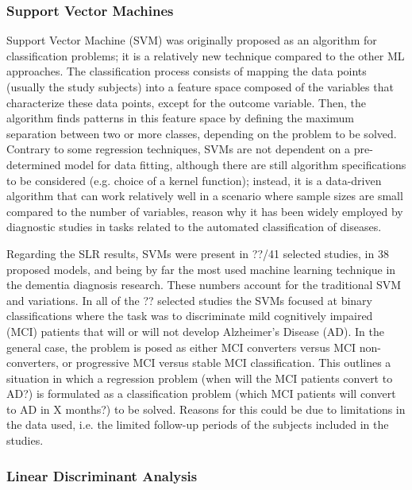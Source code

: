 \documentclass[10pt, letterpaper, twoside, openany]{thesis}
\begin{document}
\subsubsection{Support Vector Machines}
Support Vector Machine (SVM) was originally proposed as an algorithm for classification problems; it is a relatively new technique compared to the other ML approaches. The classification process consists of mapping the data points (usually the study subjects) into a feature space composed of the variables that characterize these data points, except for the outcome variable. Then, the algorithm finds patterns in this feature space by defining the maximum separation between two or more classes, depending on the problem to be solved. Contrary to some regression techniques, SVMs are not dependent on a pre-determined model for data fitting, although there are still algorithm specifications to be considered (e.g. choice of a kernel function); instead, it is a data-driven algorithm that can work relatively well in a scenario where sample sizes are small compared to the number of variables, reason why it has been widely employed by diagnostic studies in tasks related to the automated classification of diseases. 
\par 
Regarding the SLR results, SVMs were present in ??/41 selected studies, in 38 proposed models, and being by far the most used machine learning technique in the dementia diagnosis research. These numbers account for the traditional SVM and variations. In all of the ?? selected studies the SVMs focused at binary classifications where the task was to discriminate mild cognitively impaired (MCI) patients that will or will not develop Alzheimer's Disease (AD). In the general case, the problem is posed as either MCI converters versus MCI non-converters, or progressive MCI versus stable MCI classification. This outlines a situation in which a regression problem (when will the MCI patients convert to AD?) is formulated as a classification problem (which MCI patients will convert to AD in X months?) to be solved. Reasons for this could be due to limitations in the data used, i.e. the limited follow-up periods of the subjects included in the studies.

\subsubsection{Linear Discriminant Analysis}
\end{document}

